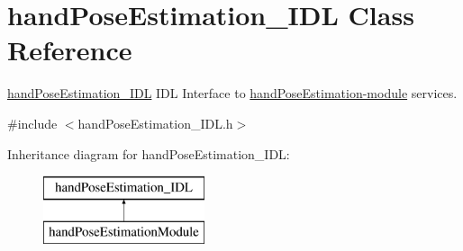 \section{hand\+Pose\+Estimation\+\_\+\+I\+DL Class Reference}
\label{classhandPoseEstimation__IDL}


\hyperlink{classhandPoseEstimation__IDL}{hand\+Pose\+Estimation\+\_\+\+I\+DL} I\+DL Interface to \hyperlink{group__handPoseEstimation-module}{hand\+Pose\+Estimation-\/module} services.  




{\ttfamily \#include $<$hand\+Pose\+Estimation\+\_\+\+I\+D\+L.\+h$>$}

Inheritance diagram for hand\+Pose\+Estimation\+\_\+\+I\+DL\+:\begin{figure}[H]
\begin{center}
\leavevmode
\includegraphics[height=2.000000cm]{classhandPoseEstimation__IDL}
\end{center}
\end{figure}
